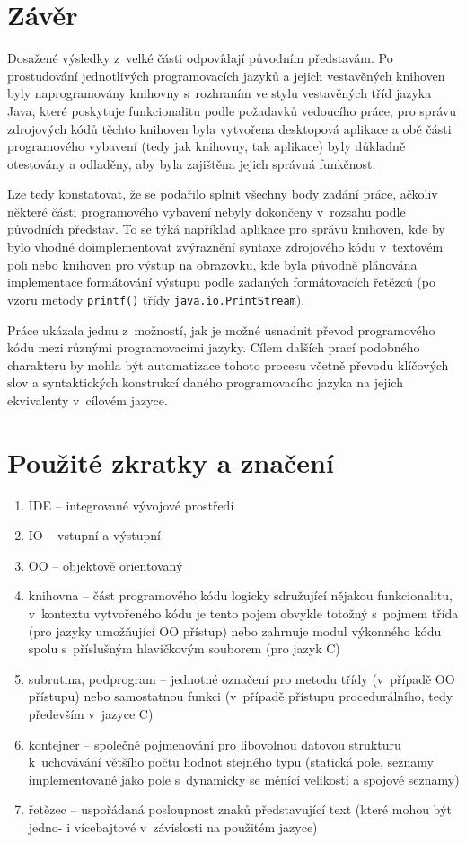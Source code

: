 \documentclass[czech,BP]{thesiskiv}
\begin{document}
\chapter{Závěr}
Dosažené výsledky z~velké části odpovídají původním představám. Po prostudování jednotlivých programovacích jazyků a jejich vestavěných knihoven byly naprogramovány knihovny s~rozhraním ve stylu vestavěných tříd jazyka Java, které poskytuje funkcionalitu podle požadavků vedoucího práce, pro správu zdrojových kódů těchto knihoven byla vytvořena desktopová aplikace a obě části programového vybavení (tedy jak knihovny, tak aplikace) byly důkladně otestovány a odladěny, aby byla zajištěna jejich správná funkčnost.\par
Lze tedy konstatovat, že se podařilo splnit všechny body zadání práce, ačkoliv některé části programového vybavení nebyly dokončeny v~rozsahu podle původních představ. To se týká například aplikace pro správu knihoven, kde by bylo vhodné doimplementovat zvýraznění syntaxe zdrojového kódu v~textovém poli nebo knihoven pro výstup na obrazovku, kde byla původně plánována implementace formátování výstupu podle zadaných formátovacích řetězců (po vzoru metody \texttt{printf()} třídy \texttt{java.io.PrintStream}).\par
Práce ukázala jednu z~možností, jak je možné usnadnit převod programového kódu mezi různými programovacími jazyky. Cílem dalších prací podobného charakteru by mohla být automatizace tohoto procesu včetně převodu klíčových slov a syntaktických konstrukcí daného programovacího jazyka na jejich ekvivalenty v~cílovém jazyce.


% 
%

{\raggedright\small

}

\chapter*{Použité zkratky a značení}
\begin{enumerate}
\item{IDE -- integrované vývojové prostředí}
\item{IO -- vstupní a výstupní}
\item{OO -- objektově orientovaný}
\item{knihovna -- část programového kódu logicky sdružující nějakou funkcionalitu, v~kontextu vytvořeného kódu je tento pojem obvykle totožný s~pojmem třída (pro jazyky umožňující OO přístup) nebo zahrnuje modul výkonného kódu spolu s~příslušným hlavičkovým souborem (pro jazyk C)}
\item{subrutina, podprogram -- jednotné označení pro metodu třídy (v~případě OO přístupu) nebo samostatnou funkci (v~případě přístupu procedurálního, tedy především v~jazyce C)}
\item{kontejner -- společné pojmenování pro libovolnou datovou strukturu k~uchovávání většího počtu hodnot stejného typu (statická pole, seznamy implementované jako pole s~dynamicky se měnící velikostí a spojové seznamy)}
\item{řetězec -- uspořádaná posloupnost znaků představující text (které mohou být jedno- i vícebajtové v~závislosti na použitém jazyce)}
\end{enumerate}
\end{document}
